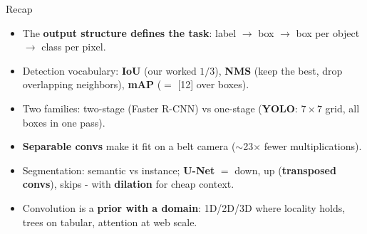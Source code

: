 \documentclass[aspectratio=169]{beamer}
\begin{document}
\begin{frame}{Recap}
  \begin{itemize}
    \item The \textbf{output structure defines the task}: label $\to$ box $\to$ box per
      object $\to$ class per pixel.
    \item Detection vocabulary: \textbf{IoU} (our worked $1/3$), \textbf{NMS} (keep the
      best, drop overlapping neighbors), \textbf{mAP} ($=$ [12] over boxes).
    \item Two families: two-stage (Faster R-CNN) vs one-stage (\textbf{YOLO}: $7\times7$
      grid, all boxes in one pass).
    \item \textbf{Separable convs} make it fit on a belt camera ($\sim$23$\times$ fewer
      multiplications).
    \item Segmentation: semantic vs instance; \textbf{U-Net} $=$ down, up
      (\textbf{transposed convs}), skips - with \textbf{dilation} for cheap context.
    \item Convolution is a \textbf{prior with a domain}: 1D/2D/3D where locality holds,
      trees on tabular, attention at web scale.
  \end{itemize}
  \vskip 6pt
\end{frame}
\end{document}
